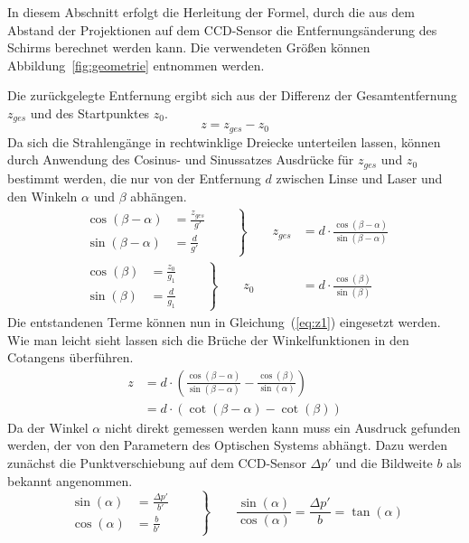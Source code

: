 In diesem Abschnitt erfolgt die Herleitung der Formel, durch die aus dem Abstand der Projektionen auf dem CCD-Sensor die Entfernungsänderung des Schirms berechnet werden kann. Die verwendeten Größen können Abbildung~\ref{fig:geometrie} entnommen werden.

Die zurückgelegte Entfernung ergibt sich aus der Differenz der Gesamtentfernung $z_{ges}$ und des Startpunktes $z_0$.
\begin{equation}
	z = z_{ges} - z_0
	\label{eq:z1}
\end{equation}
Da sich die Strahlengänge in rechtwinklige Dreiecke unterteilen lassen, können durch Anwendung des Cosinus- und Sinussatzes Ausdrücke für $z_{ges}$ und $z_0$ bestimmt werden, die nur von der Entfernung $d$ zwischen Linse und Laser und den Winkeln $\alpha$ und $\beta$ abhängen.
\begin{align}
	\left.\begin{aligned}
		\cos(\beta-\alpha) &= \frac{z_{ges}}{g'}\\
		\sin(\beta-\alpha) &= \frac{d}{g'}
	\end{aligned}\qquad\right\}\qquad z_{ges} &= d\cdot\frac{\cos(\beta-\alpha)}{\sin(\beta-\alpha)}\\[1em]
	\left.\begin{aligned}
		\cos(\beta) &= \frac{z_0}{g_1}\\ 
		\sin(\beta) &= \frac{d}{g_1}
	\end{aligned}\qquad\right\}\qquad z_0 &= d\cdot\frac{\cos(\beta)}{\sin(\beta)}
\end{align}
Die entstandenen Terme können nun in Gleichung~(\ref{eq:z1}) eingesetzt werden. Wie man leicht sieht lassen sich die Brüche der Winkelfunktionen in den Cotangens überführen. 
\begin{align}
	z &= d\cdot\left(\frac{\cos(\beta-\alpha)}{\sin(\beta-\alpha)}-\frac{\cos(\beta)}{\sin(\alpha)}\right)\\
	  &= d\cdot\left(\cot(\beta-\alpha)-\cot(\beta)\right)
	  \label{eq:z2}
\end{align}
Da der Winkel $\alpha$ nicht direkt gemessen werden kann muss ein Ausdruck gefunden werden, der von den Parametern des Optischen Systems abhängt. Dazu werden zunächst die Punktverschiebung auf dem CCD-Sensor $\Delta p'$ und die Bildweite $b$ als bekannt angenommen.
\begin{equation}
	\left.\begin{aligned}
		\sin(\alpha) &= \frac{\Delta p'}{b'}\\
	\cos(\alpha) &= \frac{b}{b'}
	\end{aligned}\qquad\right\}\qquad
	\frac{\sin(\alpha)}{\cos(\alpha)} = \frac{\Delta p'}{b} = \tan(\alpha)
\end{equation}
